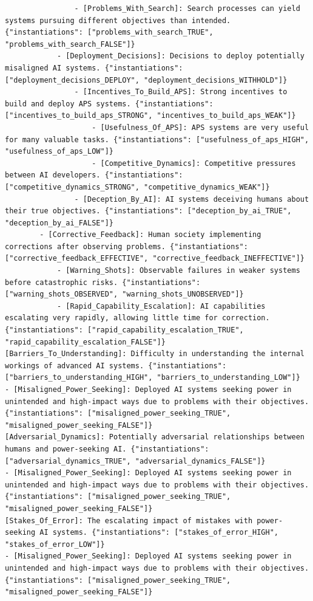 \documentclass[
  11pt,
  letterpaper,
]{book}
\begin{document}
\begin{verbatim}
                - [Problems_With_Search]: Search processes can yield systems pursuing different objectives than intended. {"instantiations": ["problems_with_search_TRUE", "problems_with_search_FALSE"]}
            - [Deployment_Decisions]: Decisions to deploy potentially misaligned AI systems. {"instantiations": ["deployment_decisions_DEPLOY", "deployment_decisions_WITHHOLD"]}
                - [Incentives_To_Build_APS]: Strong incentives to build and deploy APS systems. {"instantiations": ["incentives_to_build_aps_STRONG", "incentives_to_build_aps_WEAK"]}
                    - [Usefulness_Of_APS]: APS systems are very useful for many valuable tasks. {"instantiations": ["usefulness_of_aps_HIGH", "usefulness_of_aps_LOW"]}
                    - [Competitive_Dynamics]: Competitive pressures between AI developers. {"instantiations": ["competitive_dynamics_STRONG", "competitive_dynamics_WEAK"]}
                - [Deception_By_AI]: AI systems deceiving humans about their true objectives. {"instantiations": ["deception_by_ai_TRUE", "deception_by_ai_FALSE"]}
        - [Corrective_Feedback]: Human society implementing corrections after observing problems. {"instantiations": ["corrective_feedback_EFFECTIVE", "corrective_feedback_INEFFECTIVE"]}
            - [Warning_Shots]: Observable failures in weaker systems before catastrophic risks. {"instantiations": ["warning_shots_OBSERVED", "warning_shots_UNOBSERVED"]}
            - [Rapid_Capability_Escalation]: AI capabilities escalating very rapidly, allowing little time for correction. {"instantiations": ["rapid_capability_escalation_TRUE", "rapid_capability_escalation_FALSE"]}
[Barriers_To_Understanding]: Difficulty in understanding the internal workings of advanced AI systems. {"instantiations": ["barriers_to_understanding_HIGH", "barriers_to_understanding_LOW"]}
- [Misaligned_Power_Seeking]: Deployed AI systems seeking power in unintended and high-impact ways due to problems with their objectives. {"instantiations": ["misaligned_power_seeking_TRUE", "misaligned_power_seeking_FALSE"]}
[Adversarial_Dynamics]: Potentially adversarial relationships between humans and power-seeking AI. {"instantiations": ["adversarial_dynamics_TRUE", "adversarial_dynamics_FALSE"]}
- [Misaligned_Power_Seeking]: Deployed AI systems seeking power in unintended and high-impact ways due to problems with their objectives. {"instantiations": ["misaligned_power_seeking_TRUE", "misaligned_power_seeking_FALSE"]}
[Stakes_Of_Error]: The escalating impact of mistakes with power-seeking AI systems. {"instantiations": ["stakes_of_error_HIGH", "stakes_of_error_LOW"]}
- [Misaligned_Power_Seeking]: Deployed AI systems seeking power in unintended and high-impact ways due to problems with their objectives. {"instantiations": ["misaligned_power_seeking_TRUE", "misaligned_power_seeking_FALSE"]}
\end{verbatim}
\end{document}
